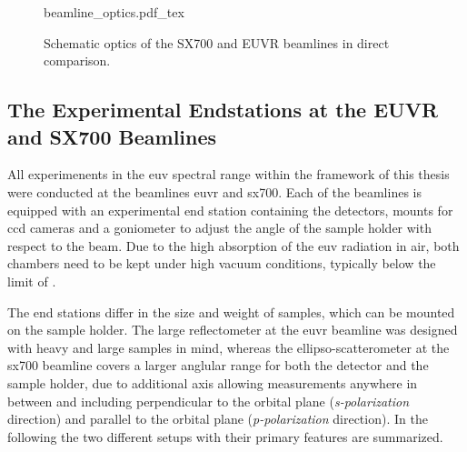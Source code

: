 \begin{figure}[htb]
    \def\svgwidth{\textwidth}
    {beamline_optics.pdf_tex}
    \caption[Schematic optics of the SX700 and EUVR beamlines.]{Schematic optics of the SX700 and EUVR beamlines in direct comparison.}
    \label{ch_exp:beamline_optics}
\end{figure}

\subsection{The Experimental Endstations at the EUVR and SX700 Beamlines}
All experimenents in the \gls{euv} spectral range within the framework of this thesis were conducted at the beamlines \acrshort{euvr} and \acrshort{sx700}. Each of the beamlines is equipped with an experimental end station containing the detectors, mounts for \gls{ccd} cameras and a goniometer to adjust the angle of the sample holder with respect to the beam. Due to the high absorption of the \gls{euv} radiation in air, both chambers need to be kept under high vacuum conditions, typically below the limit of .

The end stations differ in the size and weight of samples, which can be mounted on the sample holder. The large reflectometer at the \gls{euvr} beamline was designed with heavy and large samples in mind, whereas the ellipso-scatterometer at the \gls{sx700} beamline covers a larger anglular range for both the detector and the sample holder, due to additional axis allowing measurements anywhere in between and including perpendicular to the orbital plane (\emph{s-polarization} direction) and parallel to the orbital plane (\emph{p-polarization} direction). In the following the two different setups with their primary features are summarized. 

